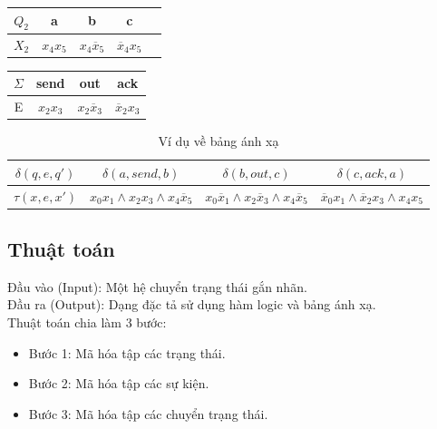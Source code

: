 \documentclass{article}
\begin{document}
\begin{flushleft}
\begin{table}[!ht]
				\begin{tabular}{|c|c|c|c|c|}
					\hline
					$Q_2$ & a & b & c\\
					\hline
					$X_2$ & $x_4x_5$ & $x_4\overline x_5$& $\overline x_4x_5$\\
					\hline
				\end{tabular}
			\end{table}
			\begin{table}[!ht]
				\centering
				\renewcommand{\arraystretch}{1.25}
				\begin{tabular}{|c|c|c|c|}
					\hline
					$\Sigma$ & send & out & ack\\
					\hline
					E & $x_2x_3$ & $x_2\overline x_3$& $\overline x_2x_3$ \\
					\hline
				\end{tabular}
			\end{table}
			\begin{table}[!ht]
				\centering
				\renewcommand{\arraystretch}{1.25}
				\begin{tabular}{|c|c|c|c|}
					\hline
					$\delta(q, e, q')$ & $\delta(a, send, b)$ & $\delta(b, out, c)$ & $\delta(c, ack, a)$\\
					\hline
					$\tau(x, e, x')$ & $x_0x_1 \land x_2x_3 \land x_4\overline x_5$ & $x_0\overline x_1 \land x_2 \overline x_3 \land x_4 \overline x_5$ & $\overline x_0 x_1 \land \overline x_2 x_3 \land x_4x_5$ \\
					\hline
				\end{tabular}
				\caption{Ví dụ về bảng ánh xạ}
			\end{table}				
		\subsection{Thuật toán}
		Đầu vào (Input): Một hệ chuyển trạng thái gắn nhãn.\\
		Đầu ra (Output): Dạng đặc tả sử dụng hàm logic và bảng ánh xạ.\\
		Thuật toán chia làm 3 bước:
		
		\begin{itemize}
			\item Bước 1: Mã hóa tập các trạng thái.
			\item Bước 2: Mã hóa tập các sự kiện.
			\item Bước 3: Mã hóa tập các chuyển trạng thái.
		\end{itemize}
		
		\begin{algorithm}[H]
			\SetAlgoLined
			\DontPrintSemicolon
				

\end{algorithm}
\end{flushleft}
\end{document}
